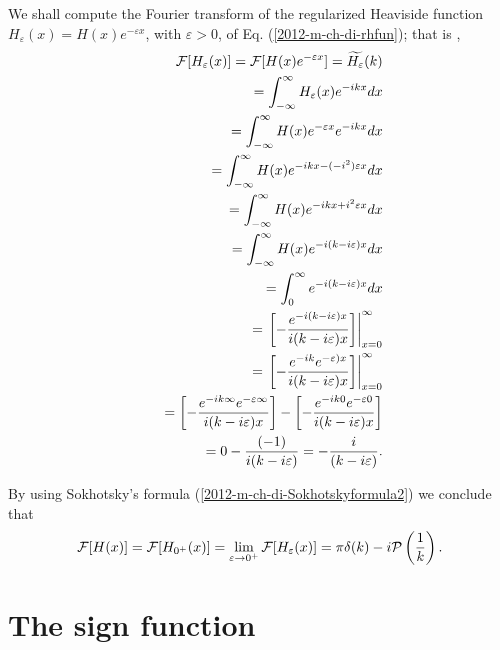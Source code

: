 {\color{OliveGreen}
\bproof
We shall compute the Fourier transform of the regularized Heaviside function
$H_\varepsilon (x) =H(x)e^{-\varepsilon x}$, with $\varepsilon >0$, of Eq. (\ref{2012-m-ch-di-rhfun}); that is  \cite{sommer-di},
\begin{equation}
\begin{split}
 {\cal F}[H_\varepsilon (x)] =
 {\cal F}[H(x)e^{-\varepsilon x}]
=\widetilde{H_\varepsilon }(k)
\\ \qquad
=   \int_{-\infty}^\infty  H_\varepsilon (x) e^{-i{kx}} dx
\\ \qquad
=   \int_{-\infty}^\infty  H(x)e^{-\varepsilon x}  e^{-i{kx}} dx
\\ \qquad
=   \int_{-\infty}^\infty  H(x) e^{-i{kx}-(-i^2)\varepsilon x}  dx
\\ \qquad
=   \int_{-\infty}^\infty  H(x) e^{-i{kx}+ i^2 \varepsilon x}  dx
\\ \qquad
=   \int_{-\infty}^\infty  H(x) e^{-i(k - i \varepsilon ) x}  dx
\\ \qquad
=   \int_{0}^\infty  e^{-i(k - i \varepsilon ) x}  dx
\\ \qquad
=  \left. \left[ -\frac{ e^{-i(k - i \varepsilon ) x}}{i(k - i \varepsilon ) x} \right] \right|_{x=0}^{\infty}
\\ \qquad
=  \left. \left[ -\frac{ e^{-ik} e^{- \varepsilon ) x}}{i(k - i \varepsilon ) x} \right] \right|_{x=0}^{\infty}
\\ \qquad
=  \left[ -\frac{ e^{-ik\infty} e^{- \varepsilon  \infty}}{i(k - i \varepsilon ) x} \right]
-  \left[ -\frac{ e^{-ik0} e^{- \varepsilon  0}}{i(k - i \varepsilon ) x} \right]
\\ \qquad
=    0 - \frac{ (-1)}{i(k - i \varepsilon ) }
=     -\frac{ i}{(k - i \varepsilon ) }
.
\end{split}
\end{equation}

By using Sokhotsky's  formula
(\ref{2012-m-ch-di-Sokhotskyformula2})
we conclude that
\begin{equation}
 {\cal F}[H(x)] =
 {\cal F}[H_{0^+} (x)] =
 \lim_{\varepsilon \rightarrow 0^+} {\cal F}[H_\varepsilon (x)] =
  \pi \delta (k)   -i {\cal P} \left(\frac{1}{k}\right)
.
\label{2012-m-ch-di-fthfu}
\end{equation}

\eproof
}




\section{The sign function}

